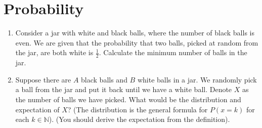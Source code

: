 \documentclass{article}
\begin{document}
\section{Probability}
\begin{enumerate}
    \item Consider a jar with white and black balls, where the  number of black balls is even. We are given that the probability that two balls, picked at random from the jar, are both white is $\frac{1}{2}$. Calculate the minimum number of balls in the jar.
    \newpage\
    \
    \newpage\
    \item Suppose there are $A$ black balls and $B$ white balls in a jar. We randomly pick a ball from the jar and put it back until we have a white ball. Denote $X$ as the number of balls we have picked.
     What would be the distribution and expectation of $X$? (The distribution is the general formula for $P(x=k)$ for each $k \in \mathbb{N}$). (You should  derive the expectation from the definition).
        \newpage
        \
        \newpage
        \
        \newpage
    \end{enumerate}
\end{document}
